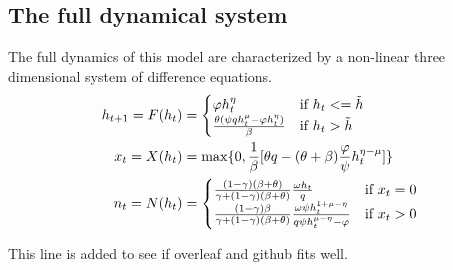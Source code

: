\subsection{The full dynamical system} 
The full dynamics of this model are characterized by a non-linear three dimensional system of difference equations.
        \begin{equation}
    \begin{aligned}
    h_{t+1} = F(h_t)  &= \begin{cases}
                    \varphi h_{t}^{\eta}  & \text{if } h_t <= \Tilde{h} \\
                     \frac{\theta (\psi q h_{t}^{\mu} - \varphi h_{t}^{\eta})}{\beta}  & \text{if } h_t > \Tilde{h}
                     \end{cases}\\
    x_t = X(h_t)  &= \max \{0, \frac{1}{\beta}[\theta q - (\theta + \beta) \frac{\varphi}{\psi}  h_t^{\eta - \mu}]\} \\
    n_t = N(h_t)  &= \begin{cases}
                \frac{(1-\gamma)(\beta + \theta)}{\gamma + (1-\gamma)(\beta + \theta)} \frac{\omega h_t}{q} & \text{if } x_t = 0 \\
                \frac{(1-\gamma)\beta}{\gamma + (1-\gamma)(\beta + \theta)} \frac{\omega \psi h_t^{1 + \mu - \eta }}{q \psi h_t^{\mu - \eta} - \varphi}   & \text{if } x_t > 0
                 \end{cases}
    \end{aligned}
    \end{equation}

This line is added to see if overleaf and github fits well. 

